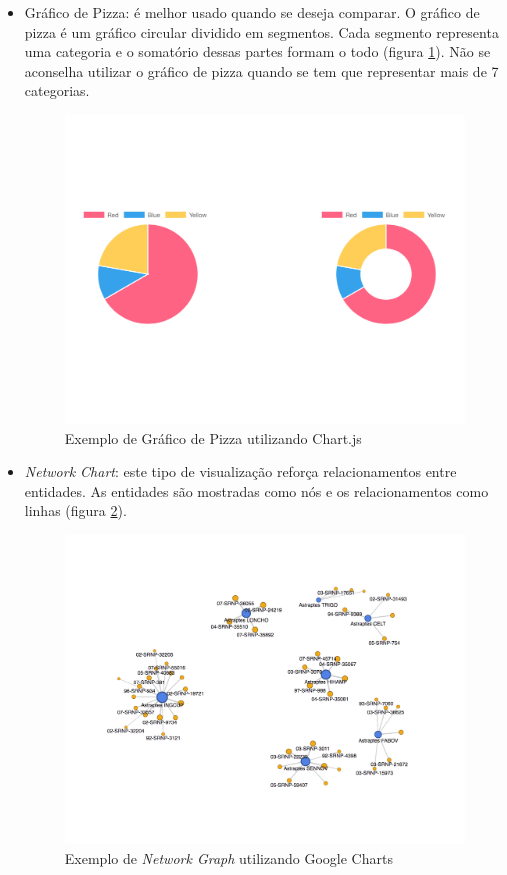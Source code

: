 \begin{itemize}
\item Gráfico de Pizza: é melhor usado quando se deseja comparar. O gráfico de pizza é um gráfico circular dividido em segmentos. Cada segmento representa uma categoria e o somatório dessas partes formam o todo (figura \ref{img:pie_chart}). Não se aconselha utilizar o gráfico de pizza quando se tem que representar mais de 7 categorias.
\graphicspath{{figuras/}}
\begin{figure}[h]
\centering
\includegraphics[scale=0.40]{pie_chart}
\caption{Exemplo de Gráfico de Pizza utilizando Chart.js}
\label{img:pie_chart}
\end{figure}

\item \textit{Network Chart}: este tipo de visualização reforça relacionamentos entre entidades. As entidades são mostradas como nós e os relacionamentos como linhas (figura \ref{img:network_graph}).
\graphicspath{{figuras/}}
\begin{figure}[h]
\centering
\includegraphics[scale=0.40]{network_graph}
\caption{Exemplo de \textit{Network Graph} utilizando Google Charts}
\label{img:network_graph}
\end{figure}
\end{itemize}

